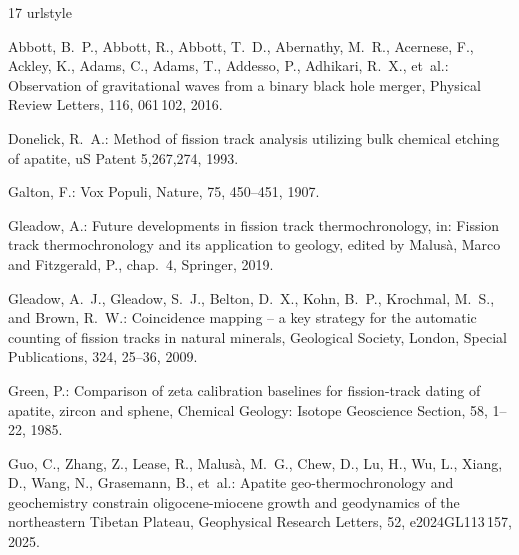 \documentclass[gchron, manuscript]{copernicus}
\begin{document}
\begin{thebibliography}{17}
\providecommand{\natexlab}[1]{#1}
\providecommand{\url}[1]{\texttt{#1}}
\providecommand{\urlprefix}{}
\expandafter\ifx\csname urlstyle\endcsname\relax
  \providecommand{\doi}[1]{https://doi.org/\discretionary{}{}{}#1}\else
  \providecommand{\doi}{https://doi.org/\discretionary{}{}{}\begingroup
  \urlstyle{rm}\Url}\fi

Abbott, B.~P., Abbott, R., Abbott, T.~D., Abernathy, M.~R., Acernese, F.,
  Ackley, K., Adams, C., Adams, T., Addesso, P., Adhikari, R.~X., et~al.:
  Observation of gravitational waves from a binary black hole merger, {Physical
  Review Letters}, 116, 061\,102, 2016.

Donelick, R.~A.: Method of fission track analysis utilizing bulk chemical
  etching of apatite, uS Patent 5,267,274, 1993.

Galton, F.: Vox Populi, Nature, 75, 450--451, 1907.

Gleadow, A.: {Future developments in fission track thermochronology}, in:
  {Fission track thermochronology and its application to geology}, edited by
  {Malus\`{a}, Marco and Fitzgerald, P.}, chap.~4, {Springer}, 2019.

Gleadow, A.~J., Gleadow, S.~J., Belton, D.~X., Kohn, B.~P., Krochmal, M.~S.,
  and Brown, R.~W.: Coincidence mapping -- a key strategy for the automatic
  counting of fission tracks in natural minerals, Geological Society, London,
  Special Publications, 324, 25--36, 2009.

Green, P.: Comparison of zeta calibration baselines for fission-track dating of
  apatite, zircon and sphene, Chemical Geology: Isotope Geoscience Section, 58,
  1--22, 1985.

Guo, C., Zhang, Z., Lease, R., Malus{\`a}, M.~G., Chew, D., Lu, H., Wu, L.,
  Xiang, D., Wang, N., Grasemann, B., et~al.: {Apatite geo-thermochronology and
  geochemistry constrain oligocene-miocene growth and geodynamics of the
  northeastern Tibetan Plateau}, Geophysical Research Letters, 52,
  e2024GL113\,157, 2025.


\end{thebibliography}
\end{document}
